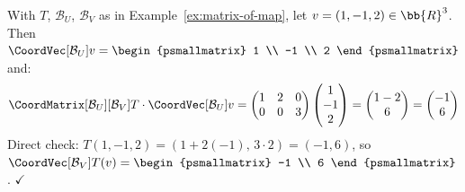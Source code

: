 \begin{example}[{$\CoordVec[\mathcal{B}_V]{T(v)} = \CoordMatrix[\mathcal{B}_U][\mathcal{B}_V]{T} \cdot \CoordVec[\mathcal{B}_U]{v}$} --- I]
    With $T$, $\mathcal{B}_U$, $\mathcal{B}_V$ as in Example~\ref{ex:matrix-of-map}, let
    $v = (1, -1, 2) \in \bb{R}^3$. Then $\CoordVec[\mathcal{B}_U]{v}
    = \begin{psmallmatrix} 1 \\ -1 \\ 2 \end{psmallmatrix}$ and:
    \[
        \CoordMatrix[\mathcal{B}_U][\mathcal{B}_V]{T} \cdot \CoordVec[\mathcal{B}_U]{v}
        = \begin{pmatrix} 1 & 2 & 0 \\ 0 & 0 & 3 \end{pmatrix}
          \begin{pmatrix} 1 \\ -1 \\ 2 \end{pmatrix}
        = \begin{pmatrix} 1 - 2 \\ 6 \end{pmatrix}
        = \begin{pmatrix} -1 \\ 6 \end{pmatrix}
    \]
    Direct check: $T(1, -1, 2) = (1 + 2(-1),\, 3 \cdot 2) = (-1, 6)$, so
    $\CoordVec[\mathcal{B}_V]{T(v)}
    = \begin{psmallmatrix} -1 \\ 6 \end{psmallmatrix}$. $\checkmark$
\end{example}

